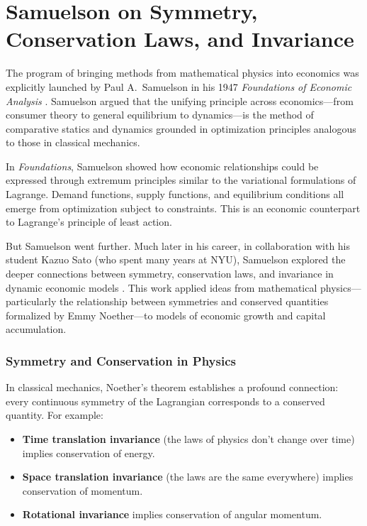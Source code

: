 \documentclass[12pt]{article}
\begin{document}
\appendix


\section{Samuelson on Symmetry, Conservation Laws, and Invariance}

The program of bringing methods from mathematical physics into economics was explicitly launched by Paul A.\ Samuelson in his 1947 \emph{Foundations of Economic Analysis} \cite{Samuelson1947}. Samuelson argued that the unifying principle across economics---from consumer theory to general equilibrium to dynamics---is the method of comparative statics and dynamics grounded in optimization principles analogous to those in classical mechanics.

In \emph{Foundations}, Samuelson showed how economic relationships could be expressed through extremum principles similar to the variational formulations of Lagrange. Demand functions, supply functions, and equilibrium conditions all emerge from optimization subject to constraints. This is an economic counterpart to Lagrange's principle of least action.

But Samuelson went further. Much later in his career, in collaboration with his student Kazuo Sato (who spent many years at NYU), Samuelson explored the deeper connections between symmetry, conservation laws, and invariance in dynamic economic models \cite{SamuelsonSato1984}. This work applied ideas from mathematical physics---particularly the relationship between symmetries and conserved quantities formalized by Emmy Noether---to models of economic growth and capital accumulation.

\subsubsection{Symmetry and Conservation in Physics}

In classical mechanics, Noether's theorem establishes a profound connection: every continuous symmetry of the Lagrangian corresponds to a conserved quantity. For example:
\begin{itemize}
\item \textbf{Time translation invariance} (the laws of physics don't change over time) implies conservation of energy.
\item \textbf{Space translation invariance} (the laws are the same everywhere) implies conservation of momentum.
\item \textbf{Rotational invariance} implies conservation of angular momentum.
\end{itemize}
\end{document}
